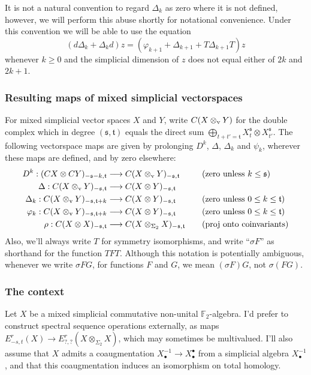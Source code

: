 \documentclass[11pt]{amsart}
\theoremstyle{plain}
\theoremstyle{definition}
\let\phi\varphi
\renewcommand{\to}{\longrightarrow}
\newcommand{\frakt}{\mathfrak{t}}
\newcommand{\fraks}{\mathfrak{s}}
\newcommand{\twist}{\sigma}
\theoremstyle{plain}
\newcommand{\F}{\mathbb{F}}
\begin{document}
It is not a natural convention to regard $\Delta_k$ as zero where it is not defined, however, we will perform this abuse shortly for notational convenience. Under this convention we will be able to use the equation
\[(d\Delta_k+\Delta_kd)z=(\phi_{k+1} +\Delta_{k+1}+T\Delta_{k+1}T)z\]
whenever $k\geq0$ and the simplicial dimension of $z$ does not equal either of $2k$ and $2k+1$.

\subsubsection*{Resulting maps of mixed simplicial vectorspaces}
For mixed simplicial vector spaces $X$ and $Y$, write $C(X\otimes_\textup{v}Y)$ for the double complex which in degree $(\fraks,\frakt)$ equals the direct sum $\bigoplus_{t+t'=\frakt}X_t^\fraks\otimes X_{t'}^\fraks$. The following vectorspace maps are given by prolonging $D^k$, $\Delta$, $\Delta_k$ and $\psi_k$, wherever these maps are defined, and by zero elsewhere:
\begin{align*}
{D}^k:(CX\otimes CY)_{-\fraks-k,\frakt}&\to C(X\otimes_\textup{v}Y)_{-\fraks,\frakt}&\quad&\textup{(zero unless $k\leq \fraks$)}\\
{\Delta}:C(X\otimes_\textup{v} Y)_{-\fraks,\frakt}&\to C(X\otimes Y)_{-\fraks,\frakt}\\
{\Delta}_k:C(X\otimes_\textup{v} Y)_{-\fraks,\frakt+k}&\to C(X\otimes Y)_{-\fraks,\frakt}&\quad&\textup{(zero unless $0\leq k\leq \frakt$)}\\
{\phi}_k:C(X\otimes_\textup{v} Y)_{-\fraks,\frakt+k}&\to C(X\otimes Y)_{-\fraks,\frakt}&\quad&\textup{(zero unless $0\leq k\leq \frakt$)}\\
{\rho}:C(X\otimes X)_{-\fraks,\frakt}&\to C(X\otimes_{\Sigma_2} X)_{-\fraks,\frakt}&\quad&\textup{(proj onto coinvariants)}
\end{align*}
Also, we'll always write $T$ for symmetry isomorphisms, and write ``$\twist F$'' as shorthand for the function $TFT$. Although this notation is potentially ambiguous, whenever we write $\sigma FG$, for functions $F$ and $G$, we mean $(\sigma F)G$, not $\sigma(FG)$.

\subsubsection*{The context}
Let $X$ be a mixed simplicial commutative non-unital $\F_2$-algebra. I'd prefer to construct spectral sequence operations externally, as maps $E^r_{-s,t}(X)\to E^r_{?,?}(X\otimes_{\Sigma_2}X)$, which may sometimes be multivalued. I'll also assume that $X$ admits a coaugmentation $X^{-1}_\bullet\to X^\bullet_\bullet$ from a simplicial algebra $X^{-1}_\bullet$, and that this coaugmentation induces an isomorphism on total homology.
\end{document}
